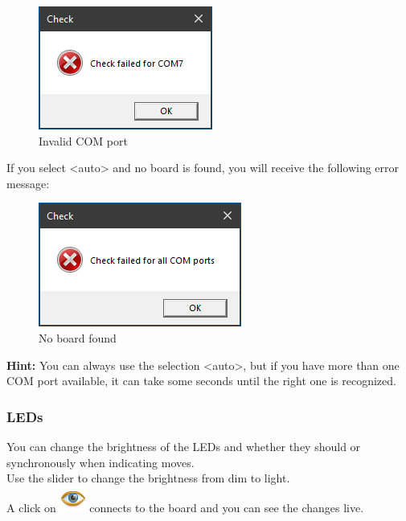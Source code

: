 \documentclass[11pt,a4paper]{article}
\begin{document}
\begin{figure}[H]
	\centering
	\includegraphics[scale=1.0]{MillenniumChessLink4.png}
	\caption{Invalid COM port }
	\label{fig:MillenniumChessLink4}
\end{figure}

If you select <auto> and no board is found, you will receive the following error message:

\begin{figure}[H]
	\centering
	\includegraphics[scale=1.0]{MillenniumChessLink5.png}
	\caption{No board found }
	\label{fig:MillenniumChessLink5}
\end{figure}

\textbf{Hint:} You can always use the selection <auto>, but if you have more than one COM port available, it can take some seconds until the right one is recognized.\\

\subsubsection{LEDs}
You can change the brightness of the LEDs and whether they should or synchronously when indicating moves.\\
Use the slider to change the brightness from dim to light.\\
A click on \includegraphics[scale=0.4]{eye.png} connects to the board and you can see the changes live.
\end{document}
